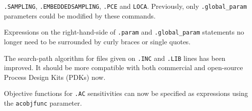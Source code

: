 \documentclass[letterpaper]{scrartcl}
\begin{document}
\begin{XyceItemize}
    \texttt{.SAMPLING}, \texttt{.EMBEDDEDSAMPLING}, \texttt{.PCE} and
    \texttt{LOCA}.  Previously, only \texttt{.global\_param}
    parameters could be modified by these commands.
  \item Expressions on the right-hand-side of \texttt{.param} 
    and \texttt{.global\_param} statements no longer need to be 
    surrounded by curly braces or single quotes.
  \item The search-path algorithm for files given on \texttt{.INC} and
    \texttt{.LIB} lines has been improved.  It should be more
    compatible with both commercial and open-source Process Design
    Kits (PDKs) now.
  \item Objective functions for \texttt{.AC} sensitivities can now be
    specified as expressions using the \texttt{acobjfunc} parameter.
\end{XyceItemize}
\end{document}

